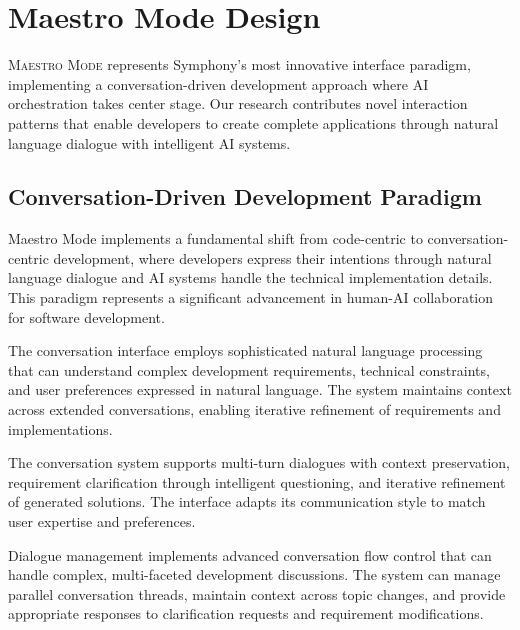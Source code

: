 
\section*{Maestro Mode Design}

\lettrine{M}{aestro Mode} represents Symphony's most innovative interface paradigm, implementing a conversation-driven development approach where AI orchestration takes center stage. Our research contributes novel interaction patterns that enable developers to create complete applications through natural language dialogue with intelligent AI systems.

\subsection*{Conversation-Driven Development Paradigm}

Maestro Mode implements a fundamental shift from code-centric to conversation-centric development, where developers express their intentions through natural language dialogue and AI systems handle the technical implementation details. This paradigm represents a significant advancement in human-AI collaboration for software development.

The conversation interface employs sophisticated natural language processing that can understand complex development requirements, technical constraints, and user preferences expressed in natural language. The system maintains context across extended conversations, enabling iterative refinement of requirements and implementations.

\begin{infobox}[title=Conversation Interface Features]
The conversation system supports multi-turn dialogues with context preservation, requirement clarification through intelligent questioning, and iterative refinement of generated solutions. The interface adapts its communication style to match user expertise and preferences.
\end{infobox}

Dialogue management implements advanced conversation flow control that can handle complex, multi-faceted development discussions. The system can manage parallel conversation threads, maintain context across topic changes, and provide appropriate responses to clarification requests and requirement modifications.

